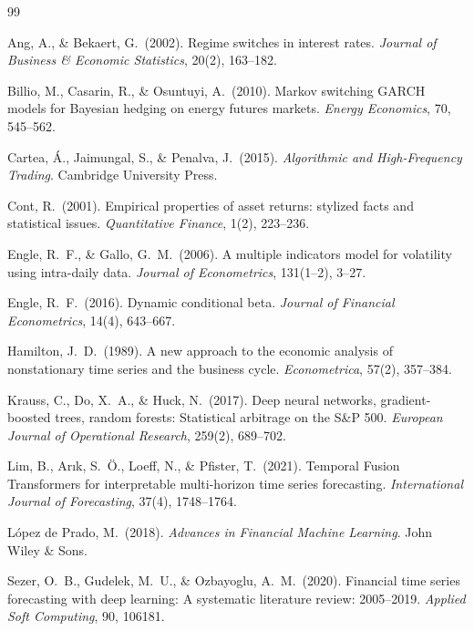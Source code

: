 \documentclass[11pt]{article}
\begin{document}
\begin{thebibliography}{99}

Ang, A., \& Bekaert, G.\ (2002).
\newblock Regime switches in interest rates.
\newblock \emph{Journal of Business \& Economic Statistics}, 20(2), 163--182.

Billio, M., Casarin, R., \& Osuntuyi, A.\ (2010).
\newblock Markov switching GARCH models for Bayesian hedging on energy futures markets.
\newblock \emph{Energy Economics}, 70, 545--562.

Cartea, \'{A}., Jaimungal, S., \& Penalva, J.\ (2015).
\newblock \emph{Algorithmic and High-Frequency Trading}.
\newblock Cambridge University Press.

Cont, R.\ (2001).
\newblock Empirical properties of asset returns: stylized facts and statistical issues.
\newblock \emph{Quantitative Finance}, 1(2), 223--236.

Engle, R.\ F., \& Gallo, G.\ M.\ (2006).
\newblock A multiple indicators model for volatility using intra-daily data.
\newblock \emph{Journal of Econometrics}, 131(1--2), 3--27.

Engle, R.\ F.\ (2016).
\newblock Dynamic conditional beta.
\newblock \emph{Journal of Financial Econometrics}, 14(4), 643--667.

Hamilton, J.\ D.\ (1989).
\newblock A new approach to the economic analysis of nonstationary time series and the business cycle.
\newblock \emph{Econometrica}, 57(2), 357--384.

Krauss, C., Do, X.\ A., \& Huck, N.\ (2017).
\newblock Deep neural networks, gradient-boosted trees, random forests: Statistical arbitrage on the S\&P 500.
\newblock \emph{European Journal of Operational Research}, 259(2), 689--702.

Lim, B., Ar\i k, S.\ \"{O}., Loeff, N., \& Pfister, T.\ (2021).
\newblock Temporal Fusion Transformers for interpretable multi-horizon time series forecasting.
\newblock \emph{International Journal of Forecasting}, 37(4), 1748--1764.

L\'{o}pez de Prado, M.\ (2018).
\newblock \emph{Advances in Financial Machine Learning}.
\newblock John Wiley \& Sons.

Sezer, O.\ B., Gudelek, M.\ U., \& Ozbayoglu, A.\ M.\ (2020).
\newblock Financial time series forecasting with deep learning: A systematic literature review: 2005--2019.
\newblock \emph{Applied Soft Computing}, 90, 106181.

\end{thebibliography}
\end{document}
